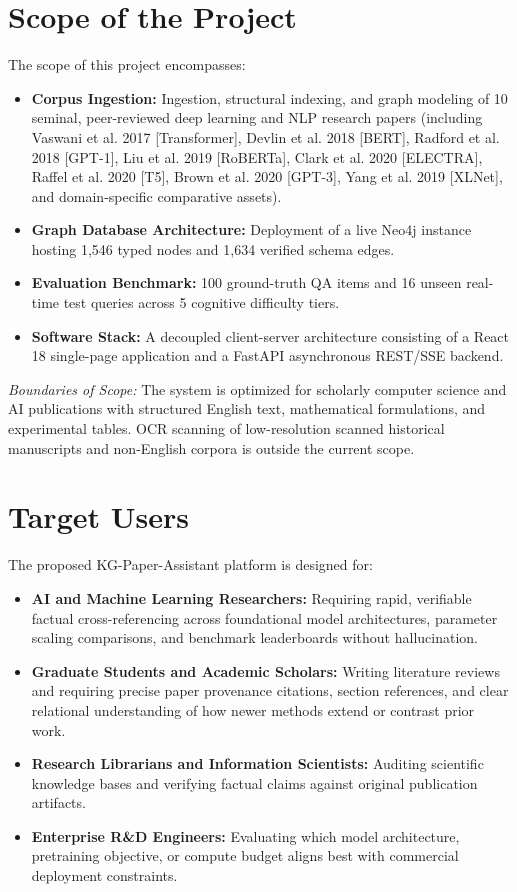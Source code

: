 \section{Scope of the Project}
The scope of this project encompasses:
\begin{itemize}
    \item \textbf{Corpus Ingestion:} Ingestion, structural indexing, and graph modeling of 10 seminal, peer-reviewed deep learning and NLP research papers (including Vaswani et al. 2017 [Transformer], Devlin et al. 2018 [BERT], Radford et al. 2018 [GPT-1], Liu et al. 2019 [RoBERTa], Clark et al. 2020 [ELECTRA], Raffel et al. 2020 [T5], Brown et al. 2020 [GPT-3], Yang et al. 2019 [XLNet], and domain-specific comparative assets).
    \item \textbf{Graph Database Architecture:} Deployment of a live Neo4j instance hosting 1,546 typed nodes and 1,634 verified schema edges.
    \item \textbf{Evaluation Benchmark:} 100 ground-truth QA items and 16 unseen real-time test queries across 5 cognitive difficulty tiers.
    \item \textbf{Software Stack:} A decoupled client-server architecture consisting of a React 18 single-page application and a FastAPI asynchronous REST/SSE backend.
\end{itemize}

\textit{Boundaries of Scope:} The system is optimized for scholarly computer science and AI publications with structured English text, mathematical formulations, and experimental tables. OCR scanning of low-resolution scanned historical manuscripts and non-English corpora is outside the current scope.

\section{Target Users}
The proposed KG-Paper-Assistant platform is designed for:
\begin{itemize}
    \item \textbf{AI and Machine Learning Researchers:} Requiring rapid, verifiable factual cross-referencing across foundational model architectures, parameter scaling comparisons, and benchmark leaderboards without hallucination.
    \item \textbf{Graduate Students and Academic Scholars:} Writing literature reviews and requiring precise paper provenance citations, section references, and clear relational understanding of how newer methods extend or contrast prior work.
    \item \textbf{Research Librarians and Information Scientists:} Auditing scientific knowledge bases and verifying factual claims against original publication artifacts.
    \item \textbf{Enterprise R\&D Engineers:} Evaluating which model architecture, pretraining objective, or compute budget aligns best with commercial deployment constraints.
\end{itemize}
